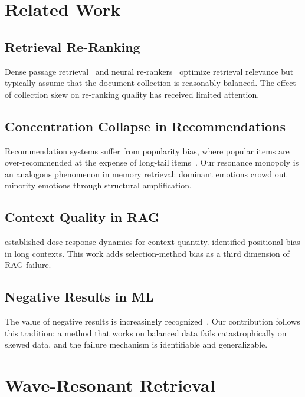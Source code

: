 \documentclass[11pt,a4paper]{article}
\begin{document}
\section{Related Work}

\subsection{Retrieval Re-Ranking}
Dense passage retrieval~\citep{karpukhin2020dpr} and neural re-rankers~\citep{nogueira2020reranking} optimize retrieval relevance but typically assume that the document collection is reasonably balanced. The effect of collection skew on re-ranking quality has received limited attention.

\subsection{Concentration Collapse in Recommendations}
Recommendation systems suffer from popularity bias, where popular items are over-recommended at the expense of long-tail items~\citep{abdollahpouri2020popularity}. Our resonance monopoly is an analogous phenomenon in memory retrieval: dominant emotions crowd out minority emotions through structural amplification.

\subsection{Context Quality in RAG}
\citet{jo2026pharmacokinetics} established dose-response dynamics for context quantity. \citet{liu2024lost} identified positional bias in long contexts. This work adds selection-method bias as a third dimension of RAG failure.

\subsection{Negative Results in ML}
The value of negative results is increasingly recognized~\citep{lipton2018troubling}. Our contribution follows this tradition: a method that works on balanced data fails catastrophically on skewed data, and the failure mechanism is identifiable and generalizable.

\section{Wave-Resonant Retrieval}
\end{document}
